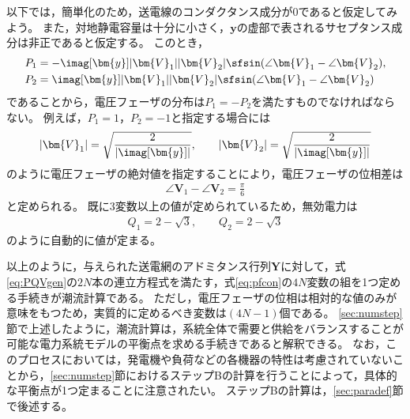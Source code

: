 \documentclass[tombow,dvipdfmx]{corona-a5-1.1}
\begin{document}
\begin{例}[2つのバスで構成される電力系統モデルの潮流計算]
以下では，簡単化のため，送電線のコンダクタンス成分が0であると仮定してみよう。
また，対地静電容量は十分に小さく，$\bm{y}$の虚部で表されるサセプタンス成分は非正であると仮定する。
このとき，
\begin{align*}
P_1 &= -\imag[\bm{y}]  |\bm{V}_1| |\bm{V}_2| \sfsin (\angle \bm{V}_1- \angle \bm{V}_2), \\
P_2 & =   \imag[\bm{y}] |\bm{V}_1| |\bm{V}_2| \sfsin (\angle \bm{V}_1- \angle \bm{V}_2)
\end{align*}
であることから，電圧フェーザの分布は$P_1 = -P_2$を満たすものでなければならない。
例えば，$P_1=1$，$P_2=-1$と指定する場合には
\begin{align*}\textstyle
|\bm{V}_1|=\sqrt{
\frac{2}{|\imag[\bm{y}]|}
}
,\qquad
 |\bm{V}_2| 
=
\sqrt{
\frac{2}{|\imag[\bm{y}]|}
}
\end{align*}
のように電圧フェーザの絶対値を指定することにより，電圧フェーザの位相差は
\begin{align*}
\angle \bm{V}_1- \angle \bm{V}_2 = \frac{\pi}{6}
\end{align*}
と定められる。
既に3変数以上の値が定められているため，無効電力は
\begin{align*}
Q_1 = 2 -\sqrt{3},\qquad
Q_2 = 2 -\sqrt{3}
\end{align*}
のように自動的に値が定まる。
\end{例}


以上のように，与えられた送電網のアドミタンス行列$\bm{Y}$に対して，式\ref{eq:PQVgen}の$2N$本の連立方程式を満たす，式\ref{eq:pfcon}の$4N$変数の組を1つ定める手続きが潮流計算である。
ただし，電圧フェーザの位相は相対的な値のみが意味をもつため，実質的に定めるべき変数は$(4N-1)$個である。
\ref{sec:numstep}節で上述したように，潮流計算は，系統全体で需要と供給をバランスすることが可能な電力系統モデルの平衡点を求める手続きであると解釈できる。
なお，このプロセスにおいては，発電機や負荷などの各機器の特性は考慮されていないことから，\ref{sec:numstep}節におけるステップBの計算を行うことによって，具体的な平衡点が1つ定まることに注意されたい。
ステップBの計算は，\ref{sec:paradef}節で後述する。

\end{document}
